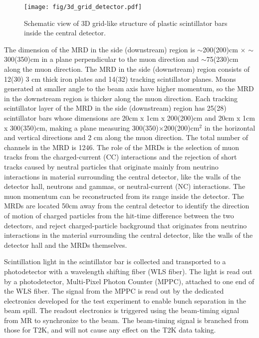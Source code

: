 \begin{figure}[tbh]
\begin{center}
\texttt{[image: fig/3d\_grid\_detector.pdf]}
\end{center}
\caption{
Schematic view of 3D grid-like structure of plastic scintillator bars inside the central detector.
}
\label{fig:3dgrid}
\end{figure}


The dimension of the MRD in the side (downstream) region is
$\sim$200(200)cm $\times$ $\sim$300(350)cm in a plane perpendicular to the muon direction
and $\sim$75(230)cm along the muon direction.
The MRD in the side (downstream) region consists of 12(30) 3 cm thick iron plates and 14(32) tracking scintillator planes.
Muons generated at smaller angle to the beam axis have higher momentum,
so the MRD in the downstream region is thicker along the muon direction.
Each tracking scintillator layer of the MRD in the side (downstream) region
has 25(28) scintillator bars whose dimensions are 20cm x 1cm x 200(200)cm and 20cm x 1cm x 300(350)cm,
making a plane measuring 300(350)$\times$200(200)cm$^{2}$ in the horizontal and vertical directions and 2 cm along the muon direction.
The total number of channels in the MRD is 1246.
The role of the MRDs is the selection of muon tracks from the charged-current (CC) interactions
and the rejection of short tracks caused by neutral particles 
that originate mainly from neutrino interactions in material surrounding the central detector, like the walls of the detector hall,
neutrons and gammas, or neutral-current (NC) interactions.
The muon momentum can be reconstructed from its range inside the detector.
The MRDs are located 50cm away from the central detector
to identify the direction of motion of charged particles from the hit-time difference between the two detectors,
and reject charged-particle background
that originates from neutrino interactions in the material surrounding the central detector, like the walls of the detector hall and the MRDs themselves.


Scintillation light in the scintillator bar is collected and transported to a photodetector with a wavelength shifting fiber (WLS fiber).
The light is read out by a photodetector, Multi-Pixel Photon Counter (MPPC), attached to one end of the WLS fiber.
The signal from the MPPC is read out by the dedicated electronics developed for the test experiment
to enable bunch separation in the beam spill.
The readout electronics is triggered using the beam-timing signal from MR to synchronize to the beam.
The beam-timing signal is branched from those for T2K, and will not cause any effect on the T2K data taking.



